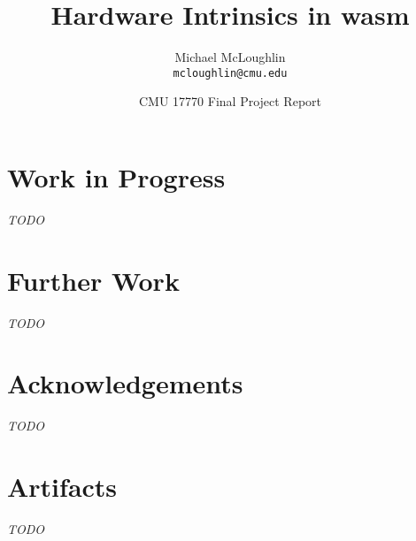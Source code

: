 \documentclass{article}
\newcommand{\wasml}{\acl{wasm}\xspace}
\begin{document}
\title{Hardware Intrinsics in \wasml}
\author{Michael McLoughlin \\ \texttt{mcloughlin@cmu.edu}}
\date{CMU 17770 Final Project Report}
\maketitle

\tableofcontents







\section{Work in Progress}
\emph{TODO}

\section{Further Work}
\label{sec:future}
\emph{TODO}


\section*{Acknowledgements}
\emph{TODO}

\appendix

\section{Artifacts}
\emph{TODO}

\printbibliography
\end{document}
